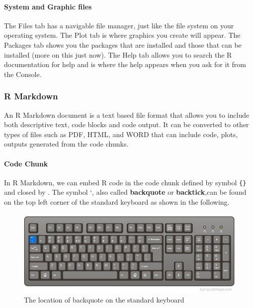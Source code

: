 \documentclass[
]{article}
\begin{document}
\hypertarget{system-and-graphic-files}{%
\paragraph{System and Graphic files}\label{system-and-graphic-files}}

The Files tab has a navigable file manager, just like the file system on
your operating system. The Plot tab is where graphics you create will
appear. The Packages tab shows you the packages that are installed and
those that can be installed (more on this just now). The Help tab allows
you to search the R documentation for help and is where the help appears
when you ask for it from the Console.

\hypertarget{r-markdown}{%
\subsubsection{R Markdown}\label{r-markdown}}

An R Markdown document is a text based file format that allows you to
include both descriptive text, code blocks and code output. It can be
converted to other types of files such as PDF, HTML, and WORD that can
include code, plots, outputs generated from the code chunks.

\hypertarget{code-chunk}{%
\paragraph{Code Chunk}\label{code-chunk}}

In R Markdown, we can embed R code in the code chunk defined by symbol
\texttt{\textasciigrave{}\textasciigrave{}\textasciigrave{}\{\}} and
closed by \texttt{\textasciigrave{}\textasciigrave{}\textasciigrave{}}.
The symbol \texttt{} `, also called \textbf{backquote} or
\textbf{backtick},can be found on the top left corner of the standard
keyboard as shown in the following.

\begin{figure}

{\centering \includegraphics[width=11.11in]{img/Key4CodeChunk} 

}

\caption{The location of backquote on the standard keyboard}\label{fig:unnamed-chunk-2}
\end{figure}
\end{document}
